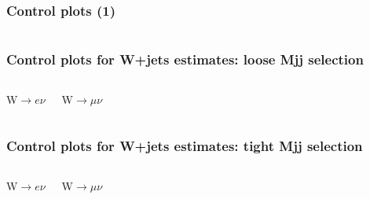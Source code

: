 \documentclass[red,compress,xcolor=table]{beamer}
\begin{document}
\begin{frame}
\frametitle{Control plots (1)}

\begin{columns}


\end{columns}
\begin{columns}
\end{columns}

\end{frame}


\begin{frame}
  \frametitle{Control plots for W+jets estimates: loose Mjj selection}

\begin{columns}
  \begin{block}{W$\rightarrow e\nu$}
  \end{block}
  \begin{block}{W$\rightarrow \mu\nu$}
  \end{block}
\end{columns}


\end{frame}

\begin{frame}
  \frametitle{Control plots for W+jets estimates: tight Mjj selection}

\begin{columns}
  \begin{block}{W$\rightarrow e\nu$}
  \end{block}
  \begin{block}{W$\rightarrow \mu\nu$}
  \end{block}
\end{columns}


\end{frame}
\end{document}
